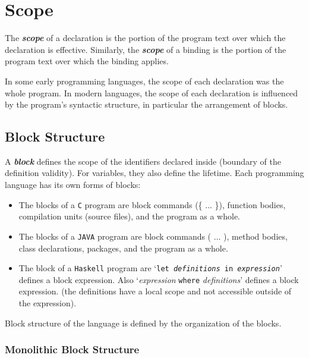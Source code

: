 \section{Scope}
\label{sec:scope}

The \textit{\textbf{scope}} of a declaration is the portion of the program text over which the declaration is effective. Similarly, the \textit{\textbf{scope}} of a binding is the portion of the program text over which the binding applies.

In some early programming languages, the scope of each declaration was the whole program. In modern languages, the scope of each declaration is influenced by the program’s syntactic structure, in particular the arrangement of blocks.

\subsection{Block Structure}

A \textit{\textbf{block}} defines the scope of the identifiers declared
inside (boundary of the definition validity). For variables, they
also define the lifetime. Each programming language has its own forms of blocks:
\begin{itemize}
  \item The blocks of a \texttt{C} program are block commands (\{ ... \}), function bodies, compilation units (source files), and the program as a whole.
  \item The blocks of a \texttt{JAVA} program are block commands ({ ... }), method bodies, class declarations, packages, and the program as a whole.
  \item The block of a \texttt{Haskell} program are `\texttt{let \textit{definitions} in \textit{expression}}' defines a block expression. Also `\textit{expression} \texttt{where} \textit{definitions}' defines a block expression. (the definitions have a local scope and not accessible outside of the expression).
\end{itemize}

Block structure of the language is defined by the organization of the blocks.

\newpage

\subsubsection{Monolithic Block Structure}

